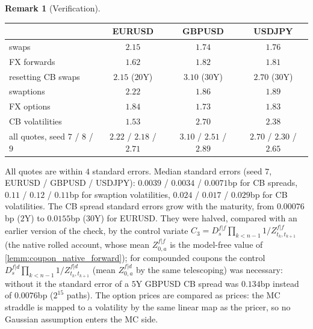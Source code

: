 \documentclass[11pt,english]{amsart}
\theoremstyle{definition}
\newtheorem{rema}{Remark}
\begin{document}
\begin{rema}[Verification]
\begin{enumerate}
\begin{center}
\begin{tabular}{|l|c|c|c|}
\hline
 & EURUSD & GBPUSD & USDJPY \\
\hline
swaps & $2.15$ & $1.74$ & $1.76$ \\
FX forwards & $1.62$ & $1.82$ & $1.81$ \\
resetting CB swaps & $2.15$ ($20$Y) & $3.10$ ($30$Y) & $2.70$ ($30$Y) \\
swaptions & $2.22$ & $1.86$ & $1.89$ \\
FX options & $1.84$ & $1.73$ & $1.83$ \\
CB volatilities & $1.53$ & $2.70$ & $2.38$ \\
\hline
all quotes, seed $7$ / $8$ / $9$ & $2.22$ / $2.18$ / $2.71$ & $3.10$ / $2.51$ / $2.89$ & $2.70$ / $2.30$ / $2.65$ \\
\hline
\end{tabular}
\end{center}
All quotes are within $4$ standard errors. Median standard errors (seed $7$, EURUSD / GBPUSD / USDJPY): $0.0039$ / $0.0034$ / $0.0071$bp for CB spreads, $0.11$ / $0.12$ / $0.11$bp for swaption volatilities, $0.024$ / $0.017$ / $0.029$bp for CB volatilities. The CB spread standard errors grow with the maturity, from $0.00076$bp ($2$Y) to $0.0155$bp ($30$Y) for EURUSD. They were halved, compared with an earlier version of the check, by the control variate $C_3 = D^{f|f}_s\prod_{k<n-1}1/Z^{f|f}_{t_k,t_{k+1}}$ (the native rolled account, whose mean $Z^{f|f}_{0,a}$ is the model-free value of \autoref{lemm:coupon_native_forward}); for compounded coupons the control $D^{f|d}_s\prod_{k<n-1}1/Z^{f|d}_{t_k,t_{k+1}}$ (mean $Z^{f|d}_{0,a}$ by the same telescoping) was necessary: without it the standard error of a $5$Y GBPUSD CB spread was $0.134$bp instead of $0.0076$bp ($2^{15}$ paths). The option prices are compared as prices: the MC straddle is mapped to a volatility by the same linear map as the pricer, so no Gaussian assumption enters the MC side.

\end{enumerate}
\end{rema}
\end{document}

